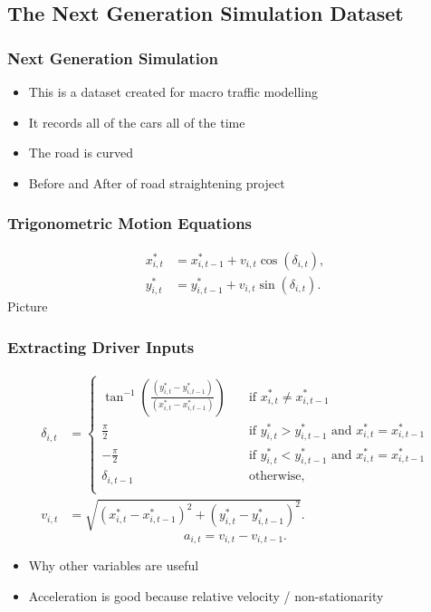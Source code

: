 \documentclass[11pt]{beamer}\usepackage[]{graphicx}\usepackage[]{color}
\begin{document}
\begin{frame}
\subsection{The Next Generation Simulation Dataset}
\frametitle{Next Generation Simulation}
\begin{itemize}
\item This is a dataset created for macro traffic modelling
\item It records all of the cars all of the time
\item The road is curved
\item Before and After of road straightening project
\end{itemize}
\end{frame}

\begin{frame}
\frametitle{Trigonometric Motion Equations}
\begin{align}
x^*_{i, t} &= x^*_{i, t-1} + v_{i, t} \cos(\delta_{i, t}) \label{xEq}, \\
y^*_{i, t} &= y^*_{i, t-1} + v_{i, t} \sin(\delta_{i, t}) \label{yEq}.
\end{align}
Picture
\end{frame}

\begin{frame}
\frametitle{Extracting Driver Inputs}
\begin{align}
\delta_{i, t} &= 
     \begin{cases}
       \tan^{-1}\left(\frac{(y^*_{i, t} - y^*_{i, t-1})}{(x^*_{i, t} - x^*_{i, t-1})} \right)  &\quad\text{if }x^*_{i, t} \neq x^*_{i, t-1} \\
       \frac{\pi}{2} &\quad\text{if } y^*_{i, t} > y^*_{i, t-1} \mbox{ and } x^*_{i, t} = x^*_{i, t-1} \\
       -\frac{\pi}{2} &\quad\text{if } y^*_{i, t} < y^*_{i, t-1} \mbox{ and } x^*_{i, t} = x^*_{i, t-1} \\
       \delta_{i, t-1} &\quad\text{otherwise,} \\ 
     \end{cases} \label{dEq} \\
v_{i, t} &= \sqrt{(x^*_{i, t} - x^*_{i, t-1})^2 + (y^*_{i, t} - y^*_{i, t-1})^2} \label{vEq}.
\end{align}
\begin{equation}
\label{aEq}
a_{i, t} = v_{i, t} - v_{i, t-1}. 
\end{equation}
\begin{itemize}
\item Why other variables are useful
\item Acceleration is good because relative velocity / non-stationarity
\end{itemize}
\end{frame}
\end{document}
